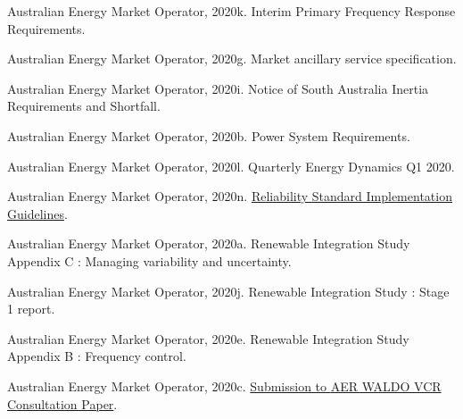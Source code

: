 \documentclass[12pt,a4paper,]{report}
\newlength{\cslhangindent}
\newenvironment{CSLReferences}[2] %
 {%
  \setlength{\parindent}{0pt}
  \ifodd #1 \everypar{\setlength{\hangindent}{\cslhangindent}}\ignorespaces\fi
  \ifnum #2 > 0
  \setlength{\parskip}{#2\baselineskip}
  \fi
 }%
 {}
\begin{document}
\begin{CSLReferences}{1}{0}
\leavevmode{}%
Australian Energy Market Operator, 2020k. Interim {Primary Frequency
Response Requirements}.

\leavevmode{}%
Australian Energy Market Operator, 2020g. Market ancillary service
specification.

\leavevmode{}%
Australian Energy Market Operator, 2020i. Notice of {South Australia
Inertia Requirements} and {Shortfall}.

\leavevmode{}%
Australian Energy Market Operator, 2020b. Power {System Requirements}.

\leavevmode{}%
Australian Energy Market Operator, 2020l. Quarterly {Energy Dynamics Q1}
2020.

\leavevmode{}%
Australian Energy Market Operator, 2020n.
\href{https://aemo.com.au/-/media/files/electricity/nem/planning_and_forecasting/rsig/reliability-standard-implementation-guidelines.pdf?la=en}{Reliability
{Standard Implementation Guidelines}}.

\leavevmode{}%
Australian Energy Market Operator, 2020a. Renewable {Integration Study
Appendix C} : {Managing} variability and uncertainty.

\leavevmode{}%
Australian Energy Market Operator, 2020j. Renewable {Integration Study}
: {Stage} 1 report.

\leavevmode{}%
Australian Energy Market Operator, 2020e. Renewable {Integration Study
Appendix B} : {Frequency} control.

\leavevmode{}%
Australian Energy Market Operator, 2020c.
\href{https://www.aer.gov.au/system/files/AEMO\%20-\%20Submission\%20to\%20AER\%20WALDO\%20VCR\%20Consultation\%20Paper\%20-\%20March\%202020.pdf}{Submission
to {AER WALDO VCR Consultation Paper}}.


\end{CSLReferences}
\end{document}
